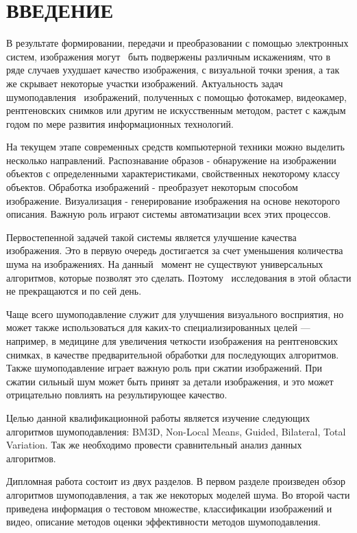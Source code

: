 \section*{ВВЕДЕНИЕ}
В результате формировании, передачи и преобразовании с помощью электронных систем, изображения могут 
быть подвержены различным искажениям, что в ряде случаев ухудшает качество изображения, с визуальной
точки зрения, а так же скрывает некоторые участки изображений.
Актуальность задач шумоподавления  изображений, полученных с помощью фотокамер, видеокамер, рентгеновских снимков или другим не искусственным методом, растет с каждым годом по мере развития информационных технологий.

На текущем этапе современных средств компьютерной техники можно выделить несколько направлений.
Распознавание образов - обнаружение на изображении объектов с определенными характеристиками, свойственных некоторому классу объектов. Обработка изображений - преобразует некоторым способом изображение. 
Визуализация - генерирование изображения на основе некоторого описания. Важную роль играют системы 
автоматизации всех этих процессов.

Первостепенной задачей такой системы является улучшение качества изображения. Это
в первую очередь достигается за счет уменьшения количества шума на изображениях. На данный 
момент не существуют универсальных алгоритмов, которые позволят это сделать. Поэтому 
исследования в этой области не прекращаются и по сей день.

Чаще всего шумоподавление служит для улучшения визуального восприятия, но
может также использоваться для каких-то специализированных целей — например, в
медицине для увеличения четкости изображения на рентгеновских снимках, в качестве
предварительной обработки для последующих алгоритмов. Также шумоподавление играет
важную роль при сжатии изображений. При сжатии сильный шум может быть принят за
детали изображения, и это может отрицательно повлиять на результирующее качество\cite{web:Kalinkina}.

Целью данной квалификационной работы является изучение следующих алгоритмов шумоподавления: BM3D,
Non-Local Means, Guided, Bilateral, Total Variation. Так же необходимо
провести сравнительный анализ данных алгоритмов.

Дипломная работа состоит из двух разделов. В первом разделе произведен обзор алгоритмов шумоподавления, а так же некоторых моделей шума. Во второй части приведена информация о тестовом множестве, классификации изображений и видео, описание методов оценки эффективности методов шумоподавления. 

